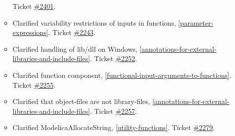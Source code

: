 \begin{itemize}
\begin{itemize}
Ticket \href{https://github.com/modelica/ModelicaSpecification/pull/2401}{\#2401}.
\item Clarified variability restrictions of inputs in functions, \cref{parameter-expressions}.
Ticket \href{https://github.com/modelica/ModelicaSpecification/issues/2243}{\#2243}.
\item Clarified handling of lib/dll on Windows, \cref{annotations-for-external-libraries-and-include-files}.
Ticket \href{https://github.com/modelica/ModelicaSpecification/issues/2252}{\#2252}.
\item Clarified function component, \cref{functional-input-arguments-to-functions}.
Ticket \href{https://github.com/modelica/ModelicaSpecification/issues/2255}{\#2255}.
\item Clarified that object-files are not library-files, \cref{annotations-for-external-libraries-and-include-files}.
Ticket \href{https://github.com/modelica/ModelicaSpecification/issues/2257}{\#2257}.
\item Clarified ModelicaAllocateString, \cref{utility-functions}.
Ticket \href{https://github.com/modelica/ModelicaSpecification/issues/2279}{\#2279}.
\end{itemize}


\end{itemize}
